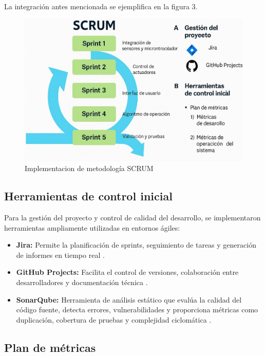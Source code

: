 \documentclass[conference]{IEEEtran}
\begin{document}
	La integración antes mencionada se ejemplifica en la figura 3.
	
	\begin{figure}[htbp]
		\centering
		\includegraphics[width=\columnwidth]{fig3.jpg}
		\caption{Implementacion de metodología SCRUM}
		\label{fig:esquema-sistema}
	\end{figure}
	
	\subsection{Herramientas de control inicial}
	
	Para la gestión del proyecto y control de calidad del desarrollo, se implementaron herramientas ampliamente utilizadas en entornos ágiles:
	
	\begin{itemize}
		\item \textbf{Jira:} Permite la planificación de sprints, seguimiento de tareas y generación de informes en tiempo real \cite{b9}.
		\item \textbf{GitHub Projects:} Facilita el control de versiones, colaboración entre desarrolladores y documentación técnica \cite{b9}.
		\item \textbf{SonarQube:} Herramienta de análisis estático que evalúa la calidad del código fuente, detecta errores, vulnerabilidades y proporciona métricas como duplicación, cobertura de pruebas y complejidad ciclomática \cite{b10}.
	\end{itemize}
	
	\subsection{Plan de métricas}
	
\end{document}
